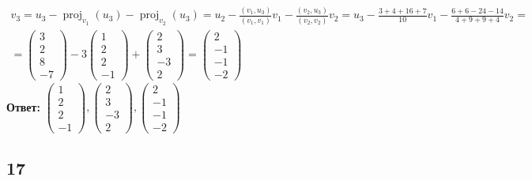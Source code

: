 \begin{multline*}
    v_3 = u_3 - \operatorname{proj}_{v_1}(u_3) - \operatorname{proj}_{v_2}(u_3) = u_2 - \frac{(v_1, u_3)}{(v_1, v_1)}v_1 - \frac{(v_2, u_3)}{(v_2, v_2)}v_2 = u_3 - \frac{3 + 4 + 16 + 7}{10}v_1 - \frac{6 + 6 - 24 - 14}{4 + 9 + 9 + 4}v_2 = \\
    =
    \begin{pmatrix}
    	3 \\
        2 \\
        8 \\
        -7
    \end{pmatrix} - 3
    \begin{pmatrix}
    	1 \\
        2 \\
        2 \\
        -1
    \end{pmatrix} +
    \begin{pmatrix}
    	2 \\
        3 \\
        -3 \\
        2
    \end{pmatrix} =
    \begin{pmatrix}
    	2 \\
        -1 \\
        -1 \\
        -2
    \end{pmatrix}
\end{multline*}
\textbf{Ответ:} $
\begin{pmatrix}
	1 \\
    2 \\
    2 \\
    -1
\end{pmatrix},
\begin{pmatrix}
	2 \\
    3 \\
    -3 \\
    2
\end{pmatrix},
\begin{pmatrix}
	2 \\
    -1 \\
    -1 \\
    -2
\end{pmatrix} $

\subsection{17}


